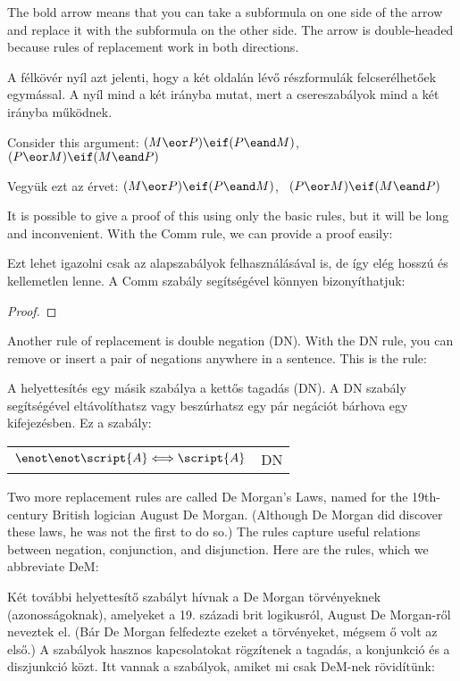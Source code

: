 The bold arrow means that you can take a subformula on one side of the arrow and replace it with the subformula on the other side. The arrow is double-headed because rules of replacement work in both directions.

A félkövér nyíl azt jelenti, hogy a két oldalán lévő részformulák felcserélhetőek egymással. A nyíl mind a két irányba mutat, mert a csereszabályok mind a két irányba működnek. 

Consider this argument: $(M \eor P) \eif (P \eand M)$, \therefore\ $(P \eor M) \eif (M \eand P)$

Vegyük ezt az érvet: $(M \eor P) \eif (P \eand M)$, \therefore\ $(P \eor M) \eif (M \eand P)$

It is possible to give a proof of this using only the basic rules, but it will be long and inconvenient. With the Comm rule, we can provide a proof easily:

Ezt lehet igazolni csak az alapszabályok felhasználásával is, de így elég hosszú és kellemetlen lenne. A Comm szabály segítségével könnyen bizonyíthatjuk: 

\begin{proof}
\end{proof}

Another rule of replacement is double negation (DN). With the DN rule, you can remove or insert a pair of negations anywhere in a sentence. This is the rule:

A helyettesítés egy másik szabálya a kettős tagadás (DN). A DN szabály segítségével eltávolíthatsz vagy beszúrhatsz egy pár negációt bárhova egy kifejezésben. Ez a szabály: 

\begin{center}
\begin{tabular}{rl}
$\enot\enot\script{A} \Longleftrightarrow \script{A}$ & DN
\end{tabular}
\end{center}

Two more replacement rules are called De Morgan's Laws, named for the 19th-century British logician August De Morgan. (Although De Morgan did discover these laws, he was not the first to do so.) The rules capture useful relations between negation, conjunction, and disjunction. Here are the rules, which we abbreviate DeM:

Két további helyettesítő szabályt hívnak a De Morgan törvényeknek (azonosságoknak), amelyeket a 19. századi brit logikusról, August De Morgan-ről neveztek el. (Bár De Morgan felfedezte ezeket a törvényeket, mégsem ő volt az első.) A szabályok hasznos kapcsolatokat rögzítenek a tagadás, a konjunkció és a diszjunkció közt. Itt vannak a szabályok, amiket mi csak DeM-nek rövidítünk:

